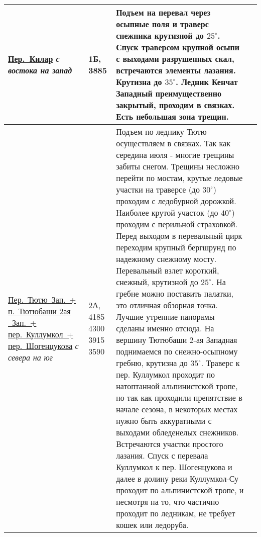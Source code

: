 {\begin{longtable}{|>{\centering\arraybackslash}m{4.5cm}|>{\centering\arraybackslash}m{1.8cm}|>{\raggedright\arraybackslash}m{9.6cm}|>{\centering\arraybackslash}m{1.2cm}|}
			\hyperref[subsec:Day16]{{\small Пер.~Килар}}																	\newline\textit{с востока на запад}		&	1Б, 3885					&	{\small Подъем на перевал через осыпные поля и траверс снежника крутизной до $25^\circ$. Спуск траверсом крупной осыпи с выходами разрушенных скал, встречаются элементы лазания. Крутизна до $35^\circ$. Ледник Кенчат Западный преимущественно закрытый, проходим в связках. Есть небольшая зона трещин.}																																																																																																																																																																																																																																																																						&			\\ \hline
			\hyperref[subsec:Day17]{{\small Пер.~Тютю~Зап.~+ п.~Тютюбаши 2ая ~Зап.~+ пер.~Куллумкол~+ пер.~Шогенцукова}}	\newline\textit{с севера на юг}			&	2А,	4185 4300 3915 3590		&	{\small Подъем по леднику Тютю осуществляем в связках. Так как середина июля - многие трещины забиты снегом. Трещины несложно перейти по мостам, крутые ледовые участки на траверсе (до $30^\circ$) проходим с ледобурной дорожкой. Наиболее крутой участок (до $40^\circ$) проходим с перильной страховкой. Перед выходом в перевальный цирк переходим крупный бергшрунд по надежному снежному мосту. Перевальный взлет короткий, снежный, крутизной до $25^\circ$. На гребне можно поставить палатки, это отличная обзорная точка. Лучшие утренние панорамы сделаны именно отсюда. На вершину Тютюбаши 2-ая Западная поднимаемся по снежно-осыпному гребню, крутизна до $35^\circ$. Траверс к пер. Куллумкол проходит по натоптанной альпинистской тропе, но так как проходили препятствие в начале сезона, в некоторых местах нужно быть аккуратными с выходами обледенелых снежников. Встречаются участки простого лазания. Спуск с перевала Куллумкол к пер. Шогенцукова и далее в долину реки Куллумкол-Су проходит по альпинистской тропе, и несмотря на то, что частично проходит по ледникам, не требует кошек или ледоруба.}																																																															&			\\ \hline
		\end{longtable}
		

}
